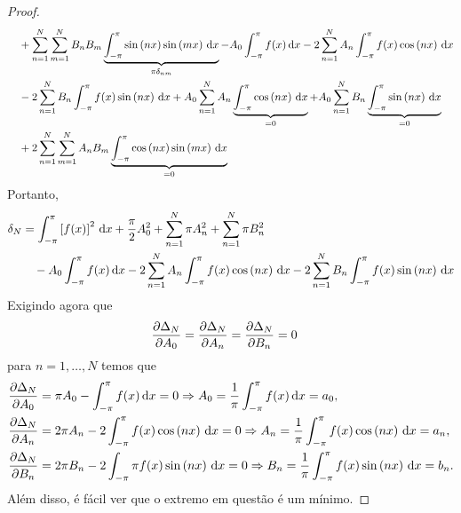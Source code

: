 \begin{proof}
\begin{align*}
\begin{split}
            &\quad {}+ \sum_{n = 1}^N \sum_{m = 1}^N B_n B_m \underbrace{\int_{-\pi}^\pi \sin\left( n x \right) \sin\left( m x \right) \, \mathrm{d}x}_{\pi \delta_{nm}} - A_0 \int_{-\pi}^\pi f(x) \, \mathrm{d}x - 2 \sum_{n = 1}^N A_n \int_{-\pi}^\pi f(x) \cos\left( n x \right) \, \mathrm{d}x \\
            &\quad {}- 2 \sum_{n = 1}^N B_n \int_{-\pi}^\pi f(x) \sin\left( n x \right) \, \mathrm{d}x + A_0 \sum_{n = 1}^N A_n \underbrace{\int_{-\pi}^\pi \cos\left( n x \right) \, \mathrm{d}x}_{=0} + A_0 \sum_{n = 1}^N B_n \underbrace{\int_{-\pi}^\pi \sin\left( n x \right) \, \mathrm{d}x}_{=0} \\
            &\quad {}+ 2 \sum_{n = 1}^N \sum_{m = 1}^N A_n B_m \underbrace{\int_{-\pi}^\pi \cos\left( n x \right) \sin\left( m x \right) \, \mathrm{d}x}_{=0}
        \end{split}
    \end{align*}
    Portanto,
    \begin{align*}
        \begin{split}
            \delta_N &= \int_{-\pi}^\pi \left[ f(x) \right]^2 \, \mathrm{d}x + \frac{\pi}{2} A_0^2 + \sum_{n = 1}^N \pi A_n^2 + \sum_{n = 1}^N \pi B_n^2 \\
            &\quad {}- A_0 \int_{-\pi}^\pi f(x) \, \mathrm{d}x - 2 \sum_{n = 1}^N A_n \int_{-\pi}^\pi f(x) \cos\left( n x \right) \, \mathrm{d}x - 2 \sum_{n = 1}^N B_n \int_{-\pi}^\pi f(x) \sin\left( n x \right) \, \mathrm{d}x
        \end{split}
    \end{align*}
    Exigindo agora que
    \begin{align*}
        \frac{\partial \Delta_N}{\partial A_0} &= \frac{\partial \Delta_N}{\partial A_n} = \frac{\partial \Delta_N}{\partial B_n} = 0
    \end{align*}
    para $n = 1, \ldots, N$ temos que
    \begin{align*}
        & \frac{\partial \Delta_N}{\partial A_0} = \pi A_0 - \int_{-\pi}^\pi f(x) \, \mathrm{d}x = 0 \Rightarrow A_0 = \frac{1}{\pi} \int_{-\pi}^\pi f(x) \, \mathrm{d}x = a_0, \\
        & \frac{\partial \Delta_N}{\partial A_n} = 2 \pi A_n - 2 \int_{-\pi}^\pi f(x) \cos\left( n x \right) \, \mathrm{d}x = 0 \Rightarrow A_n = \frac{1}{\pi} \int_{-\pi}^\pi f(x) \cos\left( n x \right) \, \mathrm{d}x = a_n, \\
        & \frac{\partial \Delta_N}{\partial B_n} = 2 \pi B_n - 2 \int_{-\pi} \pi f(x) \sin\left( n x \right) \, \mathrm{d}x = 0 \Rightarrow B_n = \frac{1}{\pi} \int_{-\pi}^\pi f(x) \sin\left( n x \right) \, \mathrm{d}x = b_n.
    \end{align*}
    Al\'{e}m disso, \'{e} f\'{a}cil ver que o extremo em quest\~{a}o \'{e} um m\'{i}nimo.
\end{proof}

